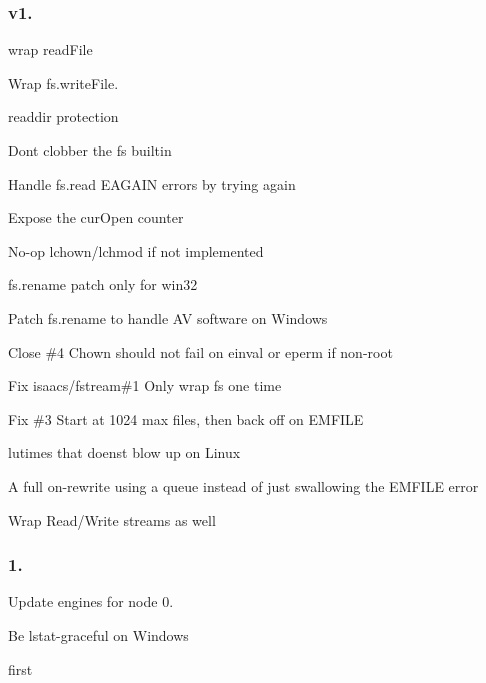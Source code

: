 \subsubsection*{v1.}


\begin{DoxyItemize}
\item wrap read\+File
\item Wrap fs.\+write\+File.
\item readdir protection
\item Don\textquotesingle{}t clobber the fs builtin
\item Handle fs.\+read E\+A\+G\+A\+IN errors by trying again
\item Expose the cur\+Open counter
\item No-\/op lchown/lchmod if not implemented
\item fs.\+rename patch only for win32
\item Patch fs.\+rename to handle AV software on Windows
\item Close \#4 Chown should not fail on einval or eperm if non-\/root
\item Fix isaacs/fstream\#1 Only wrap fs one time
\item Fix \#3 Start at 1024 max files, then back off on E\+M\+F\+I\+LE
\item lutimes that doens\textquotesingle{}t blow up on Linux
\item A full on-\/rewrite using a queue instead of just swallowing the E\+M\+F\+I\+LE error
\item Wrap Read/\+Write streams as well
\end{DoxyItemize}

\subsubsection*{1.}


\begin{DoxyItemize}
\item Update engines for node 0.
\item Be lstat-\/graceful on Windows
\item first 
\end{DoxyItemize}